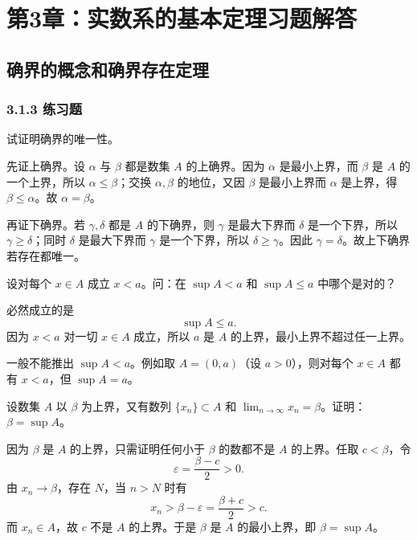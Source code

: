 ﻿%
\chapter*{第3章：实数系的基本定理习题解答}
\section{确界的概念和确界存在定理}
\subsection*{3.1.3 练习题}

\begin{xexercise}[3.1.3 练习题 1]
试证明确界的唯一性。
\end{xexercise}
\begin{xsolution}
先证上确界。设 $\alpha$ 与 $\beta$ 都是数集 $A$ 的上确界。因为 $\alpha$ 是最小上界，而 $\beta$ 是 $A$ 的一个上界，所以 $\alpha\leqslant\beta$；交换 $\alpha,\beta$ 的地位，又因 $\beta$ 是最小上界而 $\alpha$ 是上界，得 $\beta\leqslant\alpha$。故 $\alpha=\beta$。

再证下确界。若 $\gamma,\delta$ 都是 $A$ 的下确界，则 $\gamma$ 是最大下界而 $\delta$ 是一个下界，所以 $\gamma\geqslant\delta$；同时 $\delta$ 是最大下界而 $\gamma$ 是一个下界，所以 $\delta\geqslant\gamma$。因此 $\gamma=\delta$。故上下确界若存在都唯一。
\end{xsolution}

\begin{xexercise}[3.1.3 练习题 2]
设对每个 $x\in A$ 成立 $x<a$。问：在 $\sup A<a$ 和 $\sup A\leqslant a$ 中哪个是对的？
\end{xexercise}
\begin{xsolution}
必然成立的是
\[
  \sup A\leqslant a.
\]
因为 $x<a$ 对一切 $x\in A$ 成立，所以 $a$ 是 $A$ 的上界，最小上界不超过任一上界。

一般不能推出 $\sup A<a$。例如取 $A=(0,a)$（设 $a>0$），则对每个 $x\in A$ 都有 $x<a$，但 $\sup A=a$。
\end{xsolution}

\begin{xexercise}[3.1.3 练习题 3]
设数集 $A$ 以 $\beta$ 为上界，又有数列 $\{x_n\}\subset A$ 和 $\lim_{n\to\infty}x_n=\beta$。证明：$\beta=\sup A$。
\end{xexercise}
\begin{xsolution}
因为 $\beta$ 是 $A$ 的上界，只需证明任何小于 $\beta$ 的数都不是 $A$ 的上界。任取 $c<\beta$，令
\[
  \varepsilon=\frac{\beta-c}{2}>0.
\]
由 $x_n\to\beta$，存在 $N$，当 $n>N$ 时有
\[
  x_n>\beta-\varepsilon=\frac{\beta+c}{2}>c.
\]
而 $x_n\in A$，故 $c$ 不是 $A$ 的上界。于是 $\beta$ 是 $A$ 的最小上界，即 $\beta=\sup A$。
\end{xsolution}

